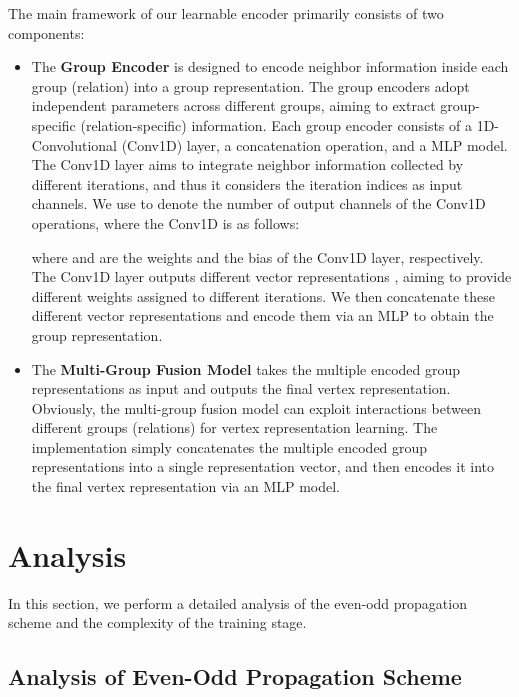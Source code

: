 \documentclass[lettersize,journal]{IEEEtran}
\begin{document}
The main framework of our learnable encoder primarily consists of two components:
\begin{itemize}
\item The \textbf{Group Encoder} is designed to encode neighbor information inside each group (relation) into a group representation.
The group encoders adopt independent parameters across different groups, aiming to extract group-specific (relation-specific) information. 
Each group encoder consists of a 1D-Convolutional (Conv1D) layer, a concatenation operation, and a MLP model.
The Conv1D layer aims to integrate neighbor information collected by different iterations, and thus it considers the iteration indices as input channels.
We use  to denote the number of output channels of the Conv1D operations, where the Conv1D is as follows:

where  and  are the weights and the bias of the Conv1D layer, respectively. 
The Conv1D layer outputs  different vector representations , aiming to provide different weights assigned to different iterations.
We then concatenate these different vector representations and encode them via an MLP to obtain the group representation.
\item The \textbf{Multi-Group Fusion Model} takes the multiple encoded group representations as input and outputs the final vertex representation.
Obviously, the multi-group fusion model can exploit interactions between different groups (relations) for vertex representation learning.
The implementation simply concatenates the multiple encoded group representations into a single representation vector, and then encodes it into the final vertex representation via an MLP model. 
\end{itemize}

  









  


  



\section{Analysis}


In this section, we perform a detailed analysis of the even-odd propagation scheme and the complexity of the training stage.


\subsection{Analysis of Even-Odd Propagation Scheme}
\end{document}
